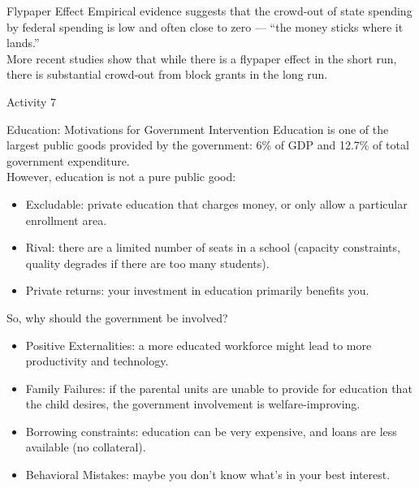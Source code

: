 \documentclass[8pt]{extarticle}
\begin{document}
  \begin{problem}{Flypaper Effect}
    Empirical evidence suggests that the crowd-out of state spending by federal spending is low and often close to zero --- ``the money sticks where it lands.''\\

    More recent studies show that while there is a flypaper effect in the short run, there is substantial crowd-out from block grants in the long run.
  \end{problem}
  \begin{problem}{Activity 7}
    \begin{tcbraster}[raster columns = 1,colframe = black!75!white,colback=white]
    \end{tcbraster}
  \end{problem}
  \begin{problem}{Education: Motivations for Government Intervention}
    Education is one of the largest public goods provided by the government: 6\% of GDP and 12.7\% of total government expenditure.\\

    However, education is not a pure public good:
    \begin{itemize}
      \item Excludable: private education that charges money, or only allow a particular enrollment area.
      \item Rival: there are a limited number of seats in a school (capacity constraints, quality degrades if there are too many students).
      \item Private returns: your investment in education primarily benefits you.
    \end{itemize}
    So, why should the government be involved?
    \begin{itemize}
      \item Positive Externalities: a more educated workforce might lead to more productivity and technology.
      \item Family Failures: if the parental units are unable to provide for education that the child desires, the government involvement is welfare-improving.
      \item Borrowing constraints: education can be very expensive, and loans are less available (no collateral).
      \item Behavioral Mistakes: maybe you don't know what's in your best interest.
    \end{itemize}
  \end{problem}
\end{document}
